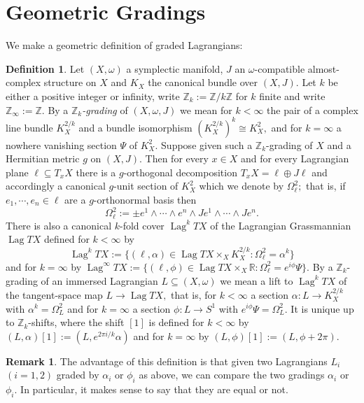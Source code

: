 \documentclass{article}
\DeclareMathOperator{\Lag}{Lag}
\theoremstyle{plain}%
\theoremstyle{definition}
\newtheorem{dfn}[thm]{Definition}
\newtheorem{rem}[thm]{Remark}
\numberwithin{equation}{section}
\numberwithin{figure}{section}
\def\l{\label}
\def\R{{\mathbin{\mathbb R}}}
\def\Z{{\mathbin{\mathbb Z}}}
\def\al{\alpha}
\def\om{\omega}
\def\ph{\phi}
\def\Ps{\Psi}
\def\Om{\Omega}
\def\w{\wedge}
\def\op{\oplus}
\def\iy{\infty}
\def\t{\times}
\def\sb{\subseteq}
\begin{document}
\section{Geometric Gradings}\l{sec2}
We make a geometric definition of graded Lagrangians:
\begin{dfn}\l{dfn gr}
Let $(X,\om)$ a symplectic manifold, $J$ an $\om$-compatible almost-complex structure on $X$
and $K_X$ the canonical bundle over $(X,J).$
Let $k$ be either a positive integer or infinity, write $\Z_k:=\Z/k\Z$ for $k$ finite and write $\Z_\iy:=\Z.$
By a {\it $\Z_k$-grading} of $(X,\om,J)$ we mean for $k<\iy$ the pair of a complex line bundle $K_X^{2/k}$ and a bundle isomorphism $(K_X^{2/k})^k\cong K_X^2,$
and for $k=\iy$ a nowhere vanishing section $\Ps$ of $K_X^2.$ 
Suppose given such a $\Z_k$-grading of $X$ and a Hermitian metric $g$ on $(X,J).$
Then for every $x\in X$ and for every Lagrangian plane $\ell\sb T_xX$
there is a $g$-orthogonal decomposition $T_xX=\ell\op J\ell$ and accordingly
a canonical $g$-unit section of $K_X^2$ which we denote by $\Om_\ell^2;$
that is, if $e_1,\cdots,e_n\in\ell$ are a $g$-orthonormal basis then 
\[\Om_\ell^2:=\pm e^1\w\cdots\w e^n\w Je^1\w\cdots\w Je^n.\]
There is also a canonical $k$-fold cover $\Lag^kTX$ of the Lagrangian Grassmannian $\Lag TX$ defined for $k<\iy$ by
\[\Lag^kTX:=\{(\ell,\al)\in\Lag TX\t_X K_X^{2/k}:\Om_\ell^2=\al^k\}\]
and for $k=\iy$ by $\Lag^\iy TX:=\{(\ell,\ph)\in\Lag TX\t_X \R:\Om_\ell^2=e^{i\ph}\Ps\}.$ 
By a $\Z_k$-grading of an immersed Lagrangian $L\sb (X,\om)$
we mean a lift to $\Lag^kTX$ of the tangent-space map $L\to \Lag TX,$
that is, for $k<\iy$  a section $\al:L\to K_X^{2/k}$ with $\al^k=\Om_L^2$
and for $k=\iy$ a section $\ph:L\to S^1$ with $e^{i\ph}\Ps=\Om_L^2.$
It is unique up to $\Z_k$-shifts,
where the shift $[1]$ is defined for $k<\iy$ by $(L,\al)[1]:=(L,e^{2\pi i/k}\al)$
and for $k=\iy$ by $(L,\ph)[1]:=(L,\ph+2\pi).$
\end{dfn}
\begin{rem}
The advantage of this definition is that given two Lagrangians $L_i$ $(i=1,2)$ graded by $\al_i$ or $\ph_i$ as above,
we can compare the two gradings $\al_i$ or $\ph_i.$
In particular, it makes sense to say that they are equal or not.
\end{rem}
\end{document}
